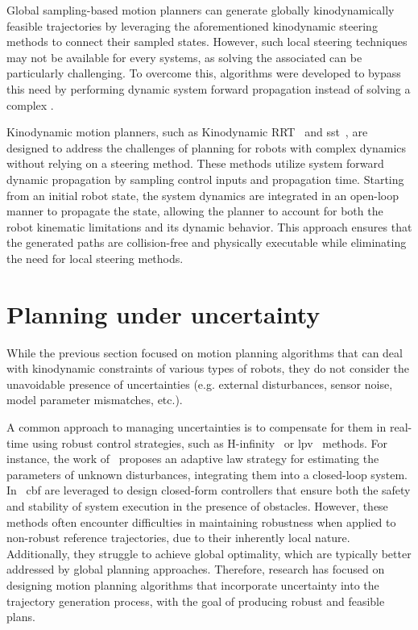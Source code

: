 Global sampling-based motion planners can generate globally kinodynamically feasible trajectories by leveraging the aforementioned kinodynamic steering methods to connect their sampled states.
However, such local steering techniques may not be available for every systems, as solving the associated  can be particularly challenging. 
To overcome this, algorithms were developed to bypass this need by performing dynamic system forward propagation instead of solving a complex .

Kinodynamic motion planners, such as Kinodynamic RRT~\cite{cKinoRRT} and \gls{sst}~\cite{cSST}, are designed to address the challenges of planning for robots with complex dynamics without relying on a steering method. 
These methods utilize system forward dynamic propagation by sampling control inputs and propagation time. 
Starting from an initial robot state, the system dynamics are integrated in an open-loop manner to propagate the state, allowing the planner to account for both the robot kinematic limitations and its dynamic behavior. 
This approach ensures that the generated paths are collision-free and physically executable while eliminating the need for local steering methods.

\section{Planning under uncertainty}\label{sec:planuncertainty}

While the previous section focused on motion planning algorithms that can deal with kinodynamic constraints of various types of robots, they do not consider the unavoidable presence of uncertainties (e.g. external disturbances, sensor noise, model parameter mismatches, etc.).

A common approach to managing uncertainties is to compensate for them in real-time using robust control strategies, such as H-infinity~\cite{cHinf} or \gls{lpv}~\cite{cLPV} methods.
For instance, the work of~\cite{cCastillo} proposes an adaptive law strategy for estimating the parameters of unknown disturbances, integrating them into a closed-loop system.
In~\cite{cMarilena} \gls{cbf} are leveraged to design closed-form controllers that ensure both the safety and stability of system execution in the presence of obstacles.
However, these methods often encounter difficulties in maintaining robustness when applied to non-robust reference trajectories, due to their inherently local nature.
Additionally, they struggle to achieve global optimality, which are typically better addressed by global planning approaches.
Therefore, research has focused on designing motion planning algorithms that incorporate uncertainty into the trajectory generation process, with the goal of producing robust and feasible plans.

